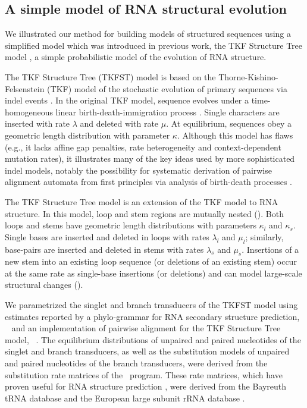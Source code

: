 \documentclass[10pt]{article}
\begin{document}
\subsection*{A simple model of RNA structural evolution}

We illustrated our method for building models of structured sequences
using a simplified model which was introduced in previous work,
the TKF Structure Tree model \cite{Holmes2004}, a simple probabilistic
model of the evolution of RNA structure.

The TKF Structure Tree (TKFST) model is based on the
Thorne-Kishino-Felsenstein (TKF) model of the stochastic evolution of
primary sequences via indel events \cite{ThorneEtal91}.  In the
original TKF model, sequence evolves under a time-homogeneous linear
birth-death-immigration process \cite{Kendall1948}.  Single characters
are inserted with rate $\lambda$ and deleted with rate $\mu$.  At
equilibrium, sequences obey a geometric length distribution with
parameter $\kappa$.  Although this model has flaws (e.g., it lacks
affine gap penalties, rate heterogeneity and context-dependent
mutation rates), it illustrates many of the key ideas used by more
sophisticated indel models, notably the possibility for systematic
derivation of pairwise alignment automata from first principles via
analysis of birth-death processes \cite{Feller71,ThorneEtal91}.

The TKF Structure Tree model is an extension of the TKF model to RNA
structure.  In this model, loop and stem regions are
mutually nested ().  Both loops and stems have geometric length
distributions with parameters $\kappa_l$ and $\kappa_s$.  Single bases
are inserted and deleted in loops with rates $\lambda_l$ and $\mu_l$;
similarly, base-pairs are inserted and deleted in stems with rates
$\lambda_s$ and $\mu_s$.  Insertions of a new stem into an existing
loop sequence (or deletions of an existing stem) occur at the same
rate as single-base insertions (or deletions) and can model
large-scale structural changes ().

We parametrized the singlet and branch transducers of the TKFST model
using estimates reported by a phylo-grammar for RNA secondary
structure prediction, \pfold\ \cite{KnudsenHein2003} and an
implementation of pairwise alignment for the TKF Structure Tree model,
\evoldoer\ \cite{Holmes2004}.
The equilibrium distributions of unpaired and paired nucleotides of
the singlet and branch transducers, as well as the substitution models
of unpaired and paired nucleotides of the branch transducers, were
derived from the substitution rate matrices of the \pfold\ program.
These rate matrices, which have proven useful for RNA structure
prediction \cite{KnudsenHein2003,DowellEddy2004,BradleyEtAl2008},
were derived from the Bayreuth tRNA database \cite{SprinzlEtAl1998}
and the European large subunit rRNA database \cite{DeRijkEtAl1998}.
\end{document}
